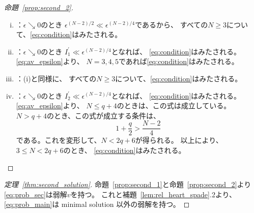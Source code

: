 \begin{proof}[命題~\ref{prop:second_2}]
 \begin{enumerate}[(i)]
  \item {}：$\epsilon \searrow 0$のとき
        $\epsilon^{(N-2)/2} \ll \epsilon^{(N-2)/4}$であるから、
        すべての$N \geq 3$について、\eqref{eq:condition}はみたされる。
  \item {}：$\epsilon \searrow 0$のとき
        $I_1^\prime \ll \epsilon^{(N-2)/4}$となれば、
        \eqref{eq:condition}はみたされる。
        \eqref{eq:av_epsilon}より、
        $N = 3, 4, 5$であれば\eqref{eq:condition}はみたされる。
  \item {}：(i)と同様に、
        すべての$N \geq 3$について、\eqref{eq:condition}はみたされる。
  \item {}：$\epsilon \searrow 0$のとき
        $I_2^\prime \ll \epsilon^{(N-2)/4}$となれば、
        \eqref{eq:condition}はみたされる。
        \eqref{eq:av_epsilon}より、
        $N \leq q + 4$のときは、この式は成立している。
        $N > q + 4$のとき、この式が成立する条件は、
        \[
         1 + \frac{q}{2} > \frac{N-2}{4}
        \]
        である。これを変形して、$N < 2q + 6$が得られる。
        以上により、$3 \leq N < 2q + 6$のとき、
        \eqref{eq:condition}はみたされる。 \qedhere
 \end{enumerate}
\end{proof}

\begin{proof}[定理~\ref{thm:second_solution}]
 命題~\ref{prop:second_1}と命題~\ref{prop:second_2}より
 \ref{eq:prob_sec}は弱解$v$を持つ。
 これと補題~\ref{lem:rel_heart_spade}.2より、\ref{eq:prob_main}は
 minimal solution 以外の弱解を持つ。
 \qedhere
\end{proof}

